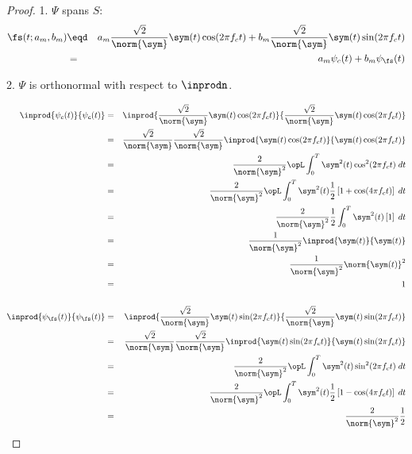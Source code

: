 \begin{proof}

1. $\Psi$ spans $S$:
\begin{eqnarray*}
   \fs(t;a_m,b_m) 
     &\eqd& a_m\frac{\sqrt{2}}{\norm{\sym}} \sym(t) \cos(2\pi f_c t) + 
            b_m\frac{\sqrt{2}}{\norm{\sym}} \sym(t) \sin(2\pi f_c t)
   \\&=&    a_m\psi_c(t) + b_m\psi_\fs(t)
\end{eqnarray*}

2. $\Psi$ is orthonormal with respect to $\inprodn$.

\begin{eqnarray*}
   \inprod{\psi_c(t)}{\psi_c(t)}
      &=& \inprod{\frac{\sqrt{2}}{\norm{\sym}} \sym(t) \cos(2\pi f_c t)}
                 {\frac{\sqrt{2}}{\norm{\sym}} \sym(t) \cos(2\pi f_c t)}
    \\&=& \frac{\sqrt{2}}{\norm{\sym}}\frac{\sqrt{2}}{\norm{\sym}}
          \inprod{ \sym(t) \cos(2\pi f_c t)}
                 { \sym(t) \cos(2\pi f_c t)}
    \\&=& \frac{2}{\norm{\sym}^2}
          \opL
          \int_0^T \sym^2(t) \cos^2(2\pi f_c t) \; dt
    \\&=& \frac{2}{\norm{\sym}^2}
          \opL
          \int_0^T \sym^2(t)\frac{1}{2}\left[1+ \cos(4\pi f_c t)\right] \; dt
    \\&=& \frac{2}{\norm{\sym}^2}\frac{1}{2}
          \int_0^T \sym^2(t)\left[ 1 \right] \; dt
    \\&=& \frac{1}{\norm{\sym}^2}
          \inprod{\sym(t)}{\sym(t)}
    \\&=& \frac{1}{\norm{\sym}^2}
          \norm{\sym(t)}^2
    \\&=& 1
\\ \\
   \inprod{\psi_\fs(t)}{\psi_\fs(t)}
      &=& \inprod{\frac{\sqrt{2}}{\norm{\sym}} \sym(t) \sin(2\pi f_c t)}
                 {\frac{\sqrt{2}}{\norm{\sym}} \sym(t) \sin(2\pi f_c t)}
    \\&=& \frac{\sqrt{2}}{\norm{\sym}}\frac{\sqrt{2}}{\norm{\sym}}
          \inprod{ \sym(t) \sin(2\pi f_c t)}
                 { \sym(t) \sin(2\pi f_c t)}
    \\&=& \frac{2}{\norm{\sym}^2}
          \opL
          \int_0^T \sym^2(t) \sin^2(2\pi f_c t) \; dt
    \\&=& \frac{2}{\norm{\sym}^2}
          \opL
          \int_0^T \sym^2(t)\frac{1}{2}\left[1- \cos(4\pi f_c t)\right] \; dt
    \\&=& \frac{2}{\norm{\sym}^2}\frac{1}{2}

\end{eqnarray*}
\end{proof}
